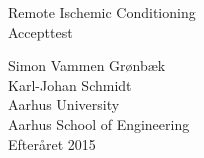 \thispagestyle{empty} %


\colorbox{usDef}{
	\parbox[t]{1.0\linewidth}{
		\centering \fontsize{30pt}{50pt}\selectfont %
		\vspace*{0.7cm} %
		
		\hfill Remote Ischemic Conditioning\\
		\hfill Accepttest \\
		
		\vspace*{0.7cm} %
	}
}

\vfill %


{\centering \large 
	\hfill Simon Vammen Grønbæk \\
	\hfill Karl-Johan Schmidt\\
	\hfill Aarhus University \\
	\hfill Aarhus School of Engineering\\
	\hfill Efteråret 2015 \\
}

\clearpage %